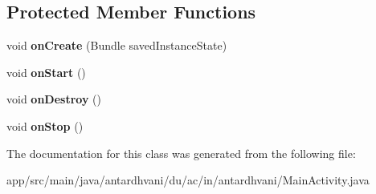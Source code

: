\subsection*{Protected Member Functions}
\begin{DoxyCompactItemize}
\item 
\hypertarget{classantardhvani_1_1du_1_1ac_1_1in_1_1antardhvani_1_1_main_activity_a513e48245db12889787be0d0616e8dec}{}void {\bfseries on\+Create} (Bundle saved\+Instance\+State)\label{classantardhvani_1_1du_1_1ac_1_1in_1_1antardhvani_1_1_main_activity_a513e48245db12889787be0d0616e8dec}

\item 
\hypertarget{classantardhvani_1_1du_1_1ac_1_1in_1_1antardhvani_1_1_main_activity_a1b4e5d48232a6b1cb64ed3704033f333}{}void {\bfseries on\+Start} ()\label{classantardhvani_1_1du_1_1ac_1_1in_1_1antardhvani_1_1_main_activity_a1b4e5d48232a6b1cb64ed3704033f333}

\item 
\hypertarget{classantardhvani_1_1du_1_1ac_1_1in_1_1antardhvani_1_1_main_activity_ad430935ce899ef257005c76fc1036d29}{}void {\bfseries on\+Destroy} ()\label{classantardhvani_1_1du_1_1ac_1_1in_1_1antardhvani_1_1_main_activity_ad430935ce899ef257005c76fc1036d29}

\item 
\hypertarget{classantardhvani_1_1du_1_1ac_1_1in_1_1antardhvani_1_1_main_activity_a1739833caa734ffe1a656f22a624d107}{}void {\bfseries on\+Stop} ()\label{classantardhvani_1_1du_1_1ac_1_1in_1_1antardhvani_1_1_main_activity_a1739833caa734ffe1a656f22a624d107}

\end{DoxyCompactItemize}


The documentation for this class was generated from the following file\+:\begin{DoxyCompactItemize}
\item 
app/src/main/java/antardhvani/du/ac/in/antardhvani/Main\+Activity.\+java\end{DoxyCompactItemize}
